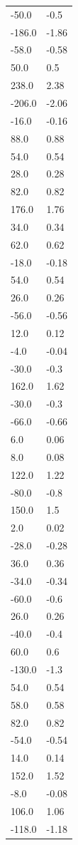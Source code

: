 \begin{longtable}{ll}
-50.0 & -0.5 \\
-186.0 & -1.86 \\
-58.0 & -0.58 \\
50.0 & 0.5 \\
238.0 & 2.38 \\
-206.0 & -2.06 \\
-16.0 & -0.16 \\
88.0 & 0.88 \\
54.0 & 0.54 \\
28.0 & 0.28 \\
82.0 & 0.82 \\
176.0 & 1.76 \\
34.0 & 0.34 \\
62.0 & 0.62 \\
-18.0 & -0.18 \\
54.0 & 0.54 \\
26.0 & 0.26 \\
-56.0 & -0.56 \\
12.0 & 0.12 \\
-4.0 & -0.04 \\
-30.0 & -0.3 \\
162.0 & 1.62 \\
-30.0 & -0.3 \\
-66.0 & -0.66 \\
6.0 & 0.06 \\
8.0 & 0.08 \\
122.0 & 1.22 \\
-80.0 & -0.8 \\
150.0 & 1.5 \\
2.0 & 0.02 \\
-28.0 & -0.28 \\
36.0 & 0.36 \\
-34.0 & -0.34 \\
-60.0 & -0.6 \\
26.0 & 0.26 \\
-40.0 & -0.4 \\
60.0 & 0.6 \\
-130.0 & -1.3 \\
54.0 & 0.54 \\
58.0 & 0.58 \\
82.0 & 0.82 \\
-54.0 & -0.54 \\
14.0 & 0.14 \\
152.0 & 1.52 \\
-8.0 & -0.08 \\
106.0 & 1.06 \\
-118.0 & -1.18 \\

\end{longtable}
